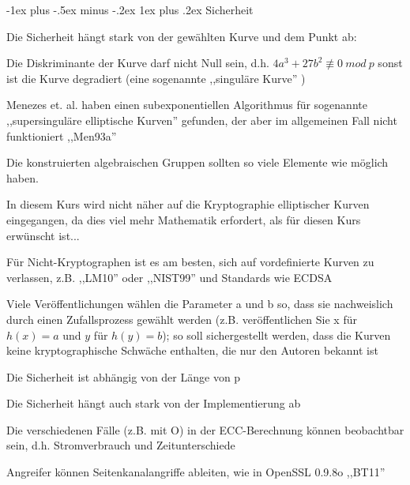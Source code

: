 \documentclass[a4paper]{article}
\makeatletter
\renewcommand{\subsubsection}{\@startsection{subsubsection}{3}{0mm}%
 {-1ex plus -.5ex minus -.2ex}%
 {1ex plus .2ex}%
 {\normalfont\small\bfseries}}
\makeatother
\begin{document}
\begin{multicols}{3}
      \subsubsection{Sicherheit}
      \begin{itemize*}
            \item Die Sicherheit hängt stark von der gewählten Kurve und dem Punkt ab:
            \item Die Diskriminante der Kurve darf nicht Null sein, d.h. $4a^3+27b^2\not\equiv 0\ mod\ p$ sonst ist die Kurve degradiert (eine sogenannte ,,singuläre Kurve'' )
            \item Menezes et. al. haben einen subexponentiellen Algorithmus für sogenannte ,,supersinguläre elliptische Kurven'' gefunden, der aber im allgemeinen Fall nicht funktioniert ,,Men93a''
            \item Die konstruierten algebraischen Gruppen sollten so viele Elemente wie möglich haben.
            \item In diesem Kurs wird nicht näher auf die Kryptographie elliptischer Kurven eingegangen, da dies viel mehr Mathematik erfordert, als für diesen Kurs erwünscht ist...
            \item Für Nicht-Kryptographen ist es am besten, sich auf vordefinierte Kurven zu verlassen, z.B. ,,LM10'' oder ,,NIST99'' und Standards wie ECDSA
            \item Viele Veröffentlichungen wählen die Parameter a und b so, dass sie nachweislich durch einen Zufallsprozess gewählt werden (z.B. veröffentlichen Sie x für $h(x)=a$ und $y$ für $h(y) = b$); so soll sichergestellt werden, dass die Kurven keine kryptographische Schwäche enthalten, die nur den Autoren bekannt ist
            \item Die Sicherheit ist abhängig von der Länge von p
            \item Die Sicherheit hängt auch stark von der Implementierung ab
            \begin{itemize*}
                  \item Die verschiedenen Fälle (z.B. mit O) in der ECC-Berechnung können beobachtbar sein, d.h. Stromverbrauch und Zeitunterschiede
                  \item Angreifer können Seitenkanalangriffe ableiten, wie in OpenSSL 0.9.8o ,,BT11''

\end{itemize*}
\end{itemize*}
\end{multicols}
\end{document}
